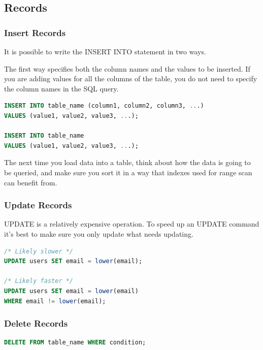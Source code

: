 \documentclass{article}
\begin{document}
\subsection{Records}

\subsubsection{Insert Records}
It is possible to write the INSERT INTO statement in two ways.

The first way specifies both the column names and the values to be inserted. If you are adding values for all the columns of the table, you do not need to specify the column names in the SQL query.

\vspace{8pt} \begin{lstlisting}[language=SQL]
INSERT INTO table_name (column1, column2, column3, ...)
VALUES (value1, value2, value3, ...);

INSERT INTO table_name
VALUES (value1, value2, value3, ...);
\end{lstlisting} \vspace{8pt}

The next time you load data into a table, think about how the data is going to be queried, and make sure you sort it in a way that indexes used for range scan can benefit from.

\subsubsection{Update Records}
UPDATE is a relatively expensive operation. To speed up an UPDATE command it's best to make sure you only update what needs updating.

\vspace{8pt} \begin{lstlisting}[language=SQL]
/* Likely slower */
UPDATE users SET email = lower(email); 

/* Likely faster */
UPDATE users SET email = lower(email)
WHERE email != lower(email);
\end{lstlisting} \vspace{8pt}

\subsubsection{Delete Records}

\vspace{8pt} \begin{lstlisting}[language=SQL]
DELETE FROM table_name WHERE condition;
\end{lstlisting} \vspace{8pt}
\end{document}

